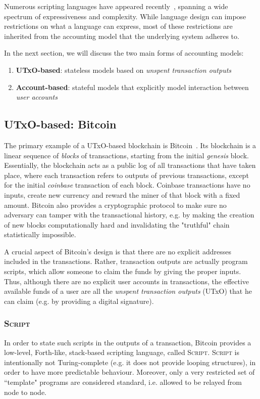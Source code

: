 \documentclass[acmsmall,nonacm=true,screen=true]{acmart}
\begin{document}
Numerous scripting languages have appeared recently~\cite{scriptlangs}, spanning a wide
spectrum of expressiveness and complexity. While language design can impose restrictions
on what a language can express, most of these restrictions are inherited from
the accounting model that the underlying system adheres to.

In the next section, we will discuss the two main forms of accounting models:
\begin{enumerate}
\item \textbf{UTxO-based}: stateless models based on \textit{unspent transaction outputs}
\item \textbf{Account-based}: stateful models that explicitly model interaction between \textit{user accounts}
\end{enumerate}

\subsection{UTxO-based: Bitcoin} \label{subsec:bitcoin}
The primary example of a UTxO-based blockchain is Bitcoin~\cite{bitcoin}.
Its blockchain is a linear sequence of \textit{blocks} of transactions,
starting from the initial \textit{genesis} block.
Essentially, the blockchain acts as a public log of all transactions that have taken place, where
each transaction refers to outputs of previous transactions,
except for the initial \textit{coinbase} transaction of each block.
Coinbase transactions have no inputs, create new currency and reward the miner of that block with a fixed amount.
Bitcoin also provides a cryptographic protocol to make sure no adversary can tamper with the transactional history,
e.g. by making the creation of new blocks computationally hard and invalidating the "truthful" chain statistically impossible.

A crucial aspect of Bitcoin's design is that there are no explicit addresses included in the transactions.
Rather, transaction outputs are actually program scripts, which allow someone to claim the funds by giving the proper inputs.
Thus, although there are no explicit user accounts in transactions, the effective available funds of a user
are all the \textit{unspent transaction outputs} (UTxO) that he can claim (e.g. by providing a digital signature).

\subsubsection{\textsc{Script}}
In order to state such scripts in the outputs of a transaction, Bitcoin provides a low-level, Forth-like,
stack-based scripting language, called \textsc{Script}.
\textsc{Script} is intentionally not Turing-complete (e.g. it does not provide looping structures),
in order to have more predictable behaviour.
Moreover, only a very restricted set of ``template" programs are considered standard, i.e.
allowed to be relayed from node to node.
\end{document}
